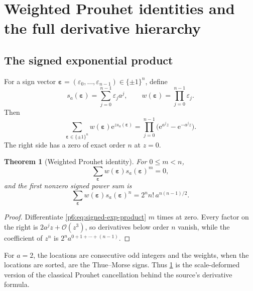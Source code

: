 \documentclass[11pt,oneside]{article}
\numberwithin{equation}{section}
\newtheorem{theorem}{Theorem}[section]
\theoremstyle{definition}
\theoremstyle{remark}
\newcommand{\e}{\mathrm e}
\newcommand{\bigO}{\mathcal O}
\begin{document}
\section{Weighted Prouhet identities and the full derivative hierarchy}

\subsection{The signed exponential product}

For a sign vector $\boldsymbol\varepsilon=(\varepsilon_0,\ldots,
\varepsilon_{n-1})\in\{\pm1\}^n$, define
\begin{equation}\label{p6:eq:sign-location}
 s_a(\boldsymbol\varepsilon)
 =\sum_{j=0}^{n-1}\varepsilon_j a^j,
 \qquad
 w(\boldsymbol\varepsilon)=\prod_{j=0}^{n-1}\varepsilon_j.
\end{equation}
Then
\begin{equation}\label{p6:eq:signed-exp-product}
 \sum_{\boldsymbol\varepsilon\in\{\pm1\}^n}
 w(\boldsymbol\varepsilon)
 \e^{z s_a(\boldsymbol\varepsilon)}
 =\prod_{j=0}^{n-1}
 \bigl(\e^{a^jz}-\e^{-a^jz}\bigr).
\end{equation}
The right side has a zero of exact order $n$ at $z=0$.

\begin{theorem}[Weighted Prouhet identity]\label{p6:thm:weighted-prouhet}
For $0\le m<n$,
\begin{equation}\label{p6:eq:prouhet-vanish}
 \sum_{\boldsymbol\varepsilon}
 w(\boldsymbol\varepsilon)s_a(\boldsymbol\varepsilon)^m=0,
\end{equation}
and the first nonzero signed power sum is
\begin{equation}\label{p6:eq:prouhet-leading}
 \sum_{\boldsymbol\varepsilon}
 w(\boldsymbol\varepsilon)s_a(\boldsymbol\varepsilon)^n
 =2^n n!\,a^{n(n-1)/2}.
\end{equation}
\end{theorem}

\begin{proof}
Differentiate \eqref{p6:eq:signed-exp-product} $m$ times at zero.  Every factor on
the right is $2a^jz+\bigO(z^3)$, so derivatives below order $n$ vanish, while
the coefficient of $z^n$ is
$2^na^{0+1+\cdots+(n-1)}$.
\end{proof}

For $a=2$, the locations are consecutive odd integers and the weights, when the
locations are sorted, are the Thue--Morse signs.  Thus
\cref{p6:thm:weighted-prouhet} is the scale-deformed version of the classical
Prouhet cancellation behind the source's derivative formula.
\end{document}
